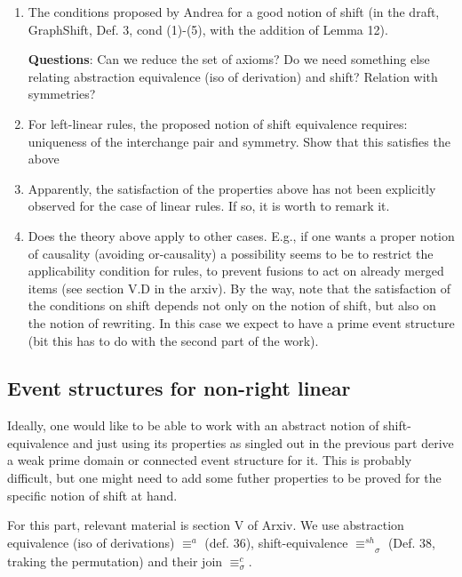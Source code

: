 \documentclass{llncs}
\newcommand{\shifteq}[1][]{\ensuremath{\mathrel{{\equiv}^\mathit{sh}_{#1}}}}
\begin{document}
\begin{enumerate}
\item The conditions proposed by Andrea for a good notion of shift (in
  the draft, GraphShift, Def. 3, cond (1)-(5), with the addition of
  Lemma 12).
  
  \textbf{Questions}: Can we reduce the set of axioms? Do we need something else relating abstraction equivalence (iso of derivation) and shift? Relation with symmetries? 

  
  
\item For left-linear rules, the proposed notion of shift equivalence
  requires: uniqueness of the interchange pair and symmetry. Show that
  this satisfies the above

\item Apparently, the satisfaction of the properties above has not
  been explicitly observed for the case of linear rules. If so, it is
  worth to remark it.

\item Does the theory above apply to other cases. E.g., if one wants a
  proper notion of causality (avoiding or-causality) a possibility
  seems to be to restrict the applicability condition for rules, to
  prevent fusions to act on already merged items (see section V.D in
  the arxiv). By the way, note that the satisfaction of the conditions
  on shift depends not only on the notion of shift, but also on the
  notion of rewriting. In this case we expect to have a prime event
  structure (bit this has to do with the second part of the work).
  
  
\end{enumerate}


\subsection*{Event structures for non-right linear}


Ideally, one would like to be able to work with an abstract notion of
shift-equivalence and just using its properties as singled out in the
previous part derive a weak prime domain or connected event structure
for it. This is probably difficult, but one might need to add some
futher properties to be proved for the specific notion of shift at
hand.


For this part, relevant material is section V of Arxiv. We use abstraction equivalence (iso of derivations) $\equiv^{a}$ (def. 36), shift-equivalence $\shifteq_\sigma$ (Def. 38, traking the permutation) and their join $\equiv^c_\sigma$.
\end{document}
